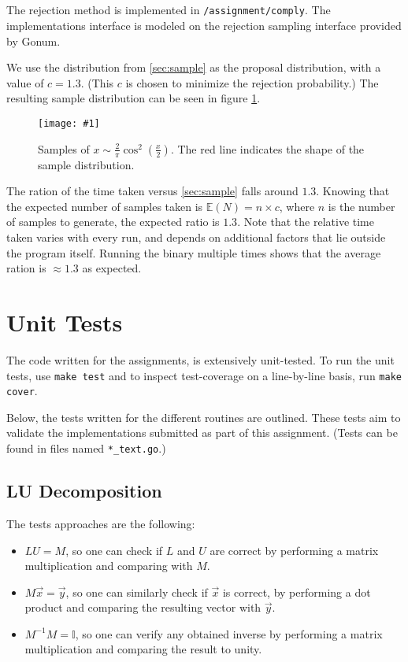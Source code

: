 \documentclass[10pt, a4paper]{article}
\newcommand{\plot}[3]{\begin{figure}[ht]\centering\texttt{[image: \#1]}\caption{#2}\label{#3}\end{figure}}
\begin{document}
  \subsection{}
  The rejection method is implemented in \texttt{/assignment/comply}. The implementations
  interface is modeled on the rejection sampling interface provided by Gonum.

  We use the distribution from \ref{sec:sample} as the proposal distribution, with a value
  of $c = 1.3$. (This $c$ is chosen to minimize the rejection probability\footnotemark{}.) The resulting
  sample distribution can be seen in figure \ref{fig:reject}.


  \plot{assignment-q-5-c}{
    Samples of $x \sim \frac{2}{\pi} \cos^2(\frac{x}{2})$. The red line indicates the shape of
    the sample distribution.
  }{fig:reject}

  The ration of the time taken versus \ref{sec:sample} falls around $1.3$. Knowing that the
  expected number of samples taken is $\mathbb{E}(N) = n \times c$, where $n$ is the number of samples
  to generate, the expected ratio is $1.3$. Note that the relative time taken varies with every run,
  and depends on additional factors that lie outside the program itself. Running the binary multiple
  times shows that the average ration is $\approx 1.3$ as expected.

{}


\appendix{}

\section{Unit Tests}
The code written for the assignments, is extensively unit-tested. To run the unit tests, use
\texttt{make test} and to inspect test-coverage on a line-by-line basis, run \texttt{make cover}.

Below, the tests written for the different routines are outlined. These tests aim to validate the
implementations submitted as part of this assignment. (Tests can be found in files named
\texttt{*\_text.go}.)

  \subsection{LU Decomposition}
  The tests approaches are the following:
  \begin{itemize}
    \item $LU = M$, so one can check if $L$ and $U$ are correct by performing a matrix multiplication
    and comparing with $M$.
    \item $M\vec{x} = \vec{y}$, so one can similarly check if $\vec{x}$ is correct, by performing
    a dot product and comparing the resulting vector with $\vec{y}$.
    \item $M^{-1}M = \mathbb{I}$, so one can verify any obtained inverse by performing a matrix
    multiplication and comparing the result to unity.
  \end{itemize}
\end{document}
